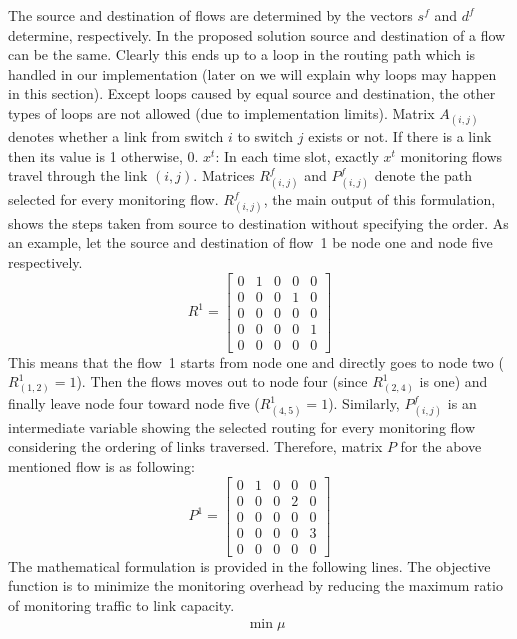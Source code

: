 \documentclass[10pt, journal, letterpaper]{IEEEtran}
\begin{document}
The source and destination of flows are determined by the vectors $s^f$ and $d^f$ determine, respectively. In the proposed solution source and destination of a flow can be the same. Clearly this ends up to a loop in the routing path which is handled in our implementation (later on we will explain why loops may happen in this section). Except loops caused by equal source and destination, the other types of loops are not allowed (due to implementation limits). Matrix $A_{(i,j)}$ denotes whether a link from switch $i$ to switch $j$ exists or not. If there is a link then its value is 1 otherwise, 0. $x^t$: In each time slot, exactly $x^t$ monitoring flows travel through the link $(i,j)$. Matrices $R^f_{(i,j)}$ and $P^f_{(i,j)}$ denote the path selected for every monitoring flow. $R^f_{(i,j)}$, the main output of this formulation, shows the steps taken from source to destination without specifying the order. As an example, let the source and destination of flow~1 be node one and node five respectively. 
\[R^1=
  \begin{bmatrix}
    0 & 1 & 0 & 0 & 0\\
    0 & 0 & 0 & 1 & 0\\
    0 & 0 & 0 & 0 & 0\\
    0 & 0 & 0 & 0 & 1\\
    0 & 0 & 0 & 0 & 0
  \end{bmatrix}\]
This means that the flow~1 starts from node one and directly goes to node two ($R^1_{(1,2)}=1$). Then the flows moves out to node four (since $R^1_{(2,4)}$ is one) and finally leave node four toward node five ($R^1_{(4,5)}=1$). Similarly, $P^f_{(i,j)}$ is an intermediate variable showing the selected routing for every monitoring flow considering the ordering of links traversed. Therefore, matrix $P$ for the above mentioned flow is as following:
\[P^1=
  \begin{bmatrix}
    0 & 1 & 0 & 0 & 0\\
    0 & 0 & 0 & 2 & 0\\
    0 & 0 & 0 & 0 & 0\\
    0 & 0 & 0 & 0 & 3\\
    0 & 0 & 0 & 0 & 0
  \end{bmatrix}\]
The mathematical formulation is provided in the following lines. The objective function is to minimize the monitoring overhead by reducing the maximum ratio of monitoring traffic to link capacity.
\begin{align}
    & \min{\mu}
\end{align}
\end{document}
